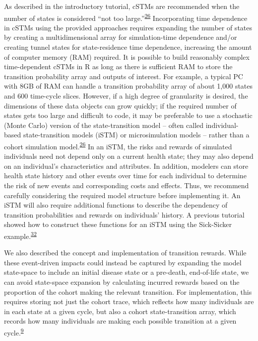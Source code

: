 \documentclass[
]{article}
\begin{document}
As described in the introductory tutorial, cSTMs are recommended when the number of states is considered ``not too large.''\textsuperscript{\protect\hyperlink{ref-Siebert2012c}{26}} Incorporating time dependence in cSTMs using the provided approaches requires expanding the number of states by creating a multidimensional array for simulation-time dependence and/or creating tunnel states for state-residence time dependence, increasing the amount of computer memory (RAM) required. It is possible to build reasonably complex time-dependent cSTMs in R as long as there is sufficient RAM to store the transition probability array and outputs of interest. For example, a typical PC with 8GB of RAM can handle a transition probability array of about 1,000 states and 600 time-cycle slices. However, if a high degree of granularity is desired, the dimensions of these data objects can grow quickly; if the required number of states gets too large and difficult to code, it may be preferable to use a stochastic (Monte Carlo) version of the state-transition model -- often called individual-based state-transition models (iSTM) or microsimulation models -- rather than a cohort simulation model.\textsuperscript{\protect\hyperlink{ref-Siebert2012c}{26}} In an iSTM, the risks and rewards of simulated individuals need not depend only on a current health state; they may also depend on an individual's characteristics and attributes. In addition, modelers can store health state history and other events over time for each individual to determine the risk of new events and corresponding costs and effects. Thus, we recommend carefully considering the required model structure before implementing it. An iSTM will also require additional functions to describe the dependency of transition probabilities and rewards on individuals' history. A previous tutorial showed how to construct these functions for an iSTM using the Sick-Sicker example.\textsuperscript{\protect\hyperlink{ref-Krijkamp2018}{32}}

We also described the concept and implementation of transition rewards. While these event-driven impacts could instead be captured by expanding the model state-space to include an initial disease state or a pre-death, end-of-life state, we can avoid state-space expansion by calculating incurred rewards based on the proportion of the cohort making the relevant transition. For implementation, this requires storing not just the cohort trace, which reflects how many individuals are in each state at a given cycle, but also a cohort state-transition array, which records how many individuals are making each possible transition at a given cycle.\textsuperscript{\protect\hyperlink{ref-Krijkamp2019}{9}}
\end{document}
